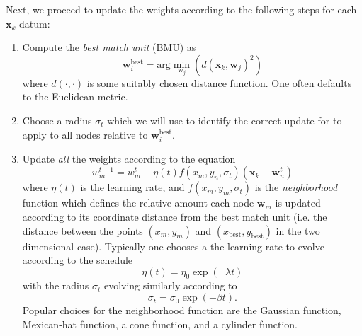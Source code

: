 Next, we proceed to update the weights according to the following steps for each $\mathbf{x}_k$ datum:
\begin{enumerate}
\item Compute the \textit{best match unit} (BMU) as
  \begin{equation}
    \mathbf{w}_{i}^{\text{best}} = \text{arg}\min\limits_{\mathbf{w}_j} \left( d(\mathbf{x}_k, \mathbf{w}_j)^2 \right)
  \end{equation}
  where $d(\cdot,\cdot)$ is some suitably chosen distance function. One often defaults to the Euclidean metric.
\item Choose a radius $\sigma_t$ which we will use to identify the correct update for to apply to all nodes relative to $\mathbf{w}_i^{\text{best}}$.
\item Update \textit{all} the weights according to the equation
  \begin{equation}
    w_{m}^{t+1} = w_m^{t} + \eta(t)f(x_m,y_n,\sigma_t)\left(\mathbf{x}_k  - \mathbf{w}_n^{t} \right)
  \end{equation}
  where $\eta(t)$ is the learning rate, and $f(x_m, y_m, \sigma_t)$ is the \textit{neighborhood} function which defines the relative amount each node $\mathbf{w}_m$ is updated according to its coordinate distance from the best match unit (i.e. the distance between the points $(x_m, y_m)$ and $(x_{\text{best}}, y_{\text{best}})$ in the two dimensional case). Typically one chooses a the learning rate to evolve according to the schedule
  \begin{equation}
    \eta(t) = \eta_0\exp(^-\lambda t)
  \end{equation}
  with the radius $\sigma_t$ evolving similarly according to
  \begin{equation}
    \sigma_t = \sigma_0\exp(-\beta t).
  \end{equation}
  Popular choices for the neighborhood function are the Gaussian function, Mexican-hat function, a cone function, and a cylinder function.
\end{enumerate}


